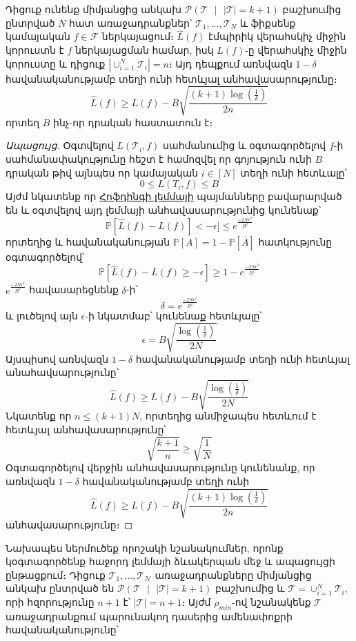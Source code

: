\documentclass[12pt]{article}
\begin{document}
\begin{lemma}
\label{task_conc_lemm}
Դիցուք ունենք միմյանցից անկախ $\mathcal{P}(\mathcal{T} \text{ } |\text{ }  |\mathcal{T}| = k +1)$ բաշխումից ընտրված $N$ հատ առաջադրանքներ՝ $\mathcal{T}_1, ..., \mathcal{T}_N$ և ֆիքսենք կամայական $f \in \mathcal{F}$ ներկայացում։ $\hat{L}(f)$ էմպիրիկ վերահսկիչ միջին կորուստն է $f$ ներկայացման համար,  իսկ $L(f)$-ը վերահսկիչ միջին կորուստը և դիցուք $|\cup_{i=1}^N{\mathcal{T}_i}| = n$։
Այդ դեպքում առնվազն $1-\delta$ հավանականությամբ տեղի ունի հետևյալ անհավասարությունը։
\begin{equation}
\hat{L}(f) \geq L(f) - B\sqrt{\frac{\left(k+1\right)\log \left(\frac{1}{\delta}\right) }{2n}}
\end{equation}
որտեղ $B$ ինչ-որ դրական հաստատուն է։
\end{lemma}
\begin{proof}[Ապացույց]
Օգտվելով $L(\mathcal{T}_i, f)$ սահմանումից և օգտագործելով $f$-ի սահմանափակությունը հեշտ է համոզվել որ գոյություն ունի $B$ դրական թիվ այնպես որ կամայական $i \in [N]$ տեղի ունի հետևալը՝
$$0 \leq L(T_i,f) \leq B$$
Այժմ նկատենք որ \hyperref [hofding_inq]{Հոֆդինգի լեմմայի} պայմանները բավարարված են և օգտվելով այդ լեմմայի անհավասարությունից կունենաք՝
$$\mathbb{P}[\hat{L}(f) - L(f)]< -\epsilon] \leq e^{\frac{-2N\epsilon^2}{B^2}}$$
որտեղից և հավանականության $\mathbb{P}[A] = 1 - \mathbb{P}[\bar A]$ հատկությունը օգտագործելով՝
$$\mathbb{P}[\hat{L}(f) - L(f) \geq -\epsilon] \geq 1 -e^{\frac{-2N\epsilon^2}{B^2}} $$
$e^{\frac{-2N\epsilon^2}{B^2}}$ հավասարեցնենք $\delta$-ի՝
$$\delta = e^{\frac{-2N\epsilon^2}{B^2}}$$
և լուծելով այն $\epsilon$-ի նկատմաբ՝ կունենաք հետևյալը՝
$$\epsilon = B \sqrt{ \frac{\log\left(\frac{1}{\delta}\right)}{2N}} $$
Այսպիսով առնվազն $1-\delta$ հավանականությամբ տեղի ունի հետևյալ անահավսարությունը՝
$$\hat{L}(f) \geq L(f) - B \sqrt{ \frac{\log\left(\frac{1}{\delta}\right)}{2N}}$$
Նկատենք որ $n \leq (k+1)N$, որտեղից անմիջապես հետևում է հետևյալ անհավասարությունը՝
$$\sqrt{\frac{k+1}{n}} \geq \sqrt{\frac{1}{N}}$$
Օգտագործելով վերջին անհավասարությունը կունենանք, որ առնվազն $1-\delta$ հավանականությամբ տեղի ունի
$$\hat{L}(f) \geq L(f) - B\sqrt{\frac{\left(k+1\right)\log \left(\frac{1}{\delta}\right) }{2n}}$$
անհավասարությունը։
\end{proof}


Նախապես ներմուծեք որոշակի նշանակումներ, որոնք  կօգտագործենք հաջորդ լեմմայի ձևակերպան մեջ և ապացույցի ընթացքում։ Դիցուք $\mathcal{T}_1, ..., \mathcal{T_N}$ առաջադրանքները միմյանցից անկախ ընտրված են $\mathcal{P}(\mathcal{T} \text{ } |\text{ }  |\mathcal{T}| = k +1)$ բաշխումից և $\mathcal{T} = \cup_{i=1}^N{\mathcal{T}_i}$, որի հզորությունը $n+1$ է՝ $|\mathcal{T}| =  n +1$։
Այժմ $\rho_{min}$-ով նշանակենք $\mathcal{T}$ առաջադրանքում պարունակող դասերից ամենափոքրի հավանականությունը՝  
\end{document}
